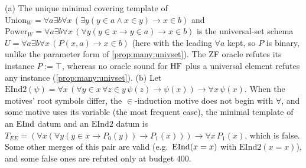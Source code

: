 \begin{proposition}\label{prop:exp:hard}
\textup{(a)} The unique minimal covering template of $\mathrm{Union}_W=\forall a\exists b\forall x\,(\exists y(y\in a\wedge x\in y)\to x\in b)$ and $\mathrm{Power}_W=\forall a\exists b\forall x\,(\forall y(y\in x\to y\in a)\to x\in b)$ is the universal-set schema $U=\forall a\exists b\forall x\,(P(x,a)\to x\in b)$ (here with the leading $\forall a$ kept, so $P$ is binary, unlike the parameter form of \cref{prop:many:univset}). The ZF oracle refutes its instance $P:=\top$, whereas no oracle sound for $\mathrm{HF}$ plus a universal element refutes any instance (\cref{prop:many:univset}).
\textup{(b)} Let $\mathrm{EInd2}(\psi)=\forall x\,(\forall y{\in}x\,\forall z{\in}y\,\psi(z)\to\psi(x))\to\forall x\,\psi(x)$. When the motives' root symbols differ, the $\in$-induction motive does not begin with $\forall$, and some motive uses its variable (the most frequent case), the minimal template of an $\mathrm{EInd}$ datum and an $\mathrm{EInd2}$ datum is $T_{EE}=(\forall x(\forall y(y\in x\to P_0(y))\to P_1(x)))\to\forall x\,P_1(x)$, which is false. Some other merges of this pair are valid (e.g.\ $\mathrm{EInd}(x=x)$ with $\mathrm{EInd2}(x=x)$), and some false ones are refuted only at budget $400$.
\end{proposition}

